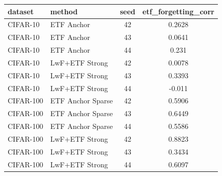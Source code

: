 \begin{tabular}{llcc}
\hline
dataset & method & seed & etf\_forgetting\_corr \\
\hline
CIFAR-10 & ETF Anchor & 42 & 0.2628 \\
CIFAR-10 & ETF Anchor & 43 & 0.0641 \\
CIFAR-10 & ETF Anchor & 44 & 0.231 \\
CIFAR-10 & LwF+ETF Strong & 42 & 0.0078 \\
CIFAR-10 & LwF+ETF Strong & 43 & 0.3393 \\
CIFAR-10 & LwF+ETF Strong & 44 & -0.011 \\
CIFAR-100 & ETF Anchor Sparse & 42 & 0.5906 \\
CIFAR-100 & ETF Anchor Sparse & 43 & 0.6449 \\
CIFAR-100 & ETF Anchor Sparse & 44 & 0.5586 \\
CIFAR-100 & LwF+ETF Strong & 42 & 0.8823 \\
CIFAR-100 & LwF+ETF Strong & 43 & 0.3434 \\
CIFAR-100 & LwF+ETF Strong & 44 & 0.6097 \\
\hline
\end{tabular}
